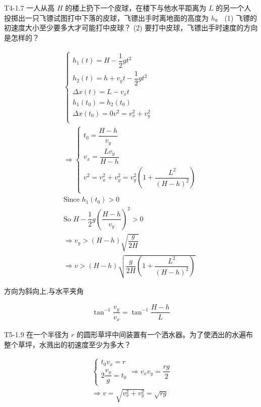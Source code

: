 \documentclass[UTF8]{ctexart} %
\begin{document}
\begin{question}{T4-1.7}
一人从高 \(H\) 的楼上扔下一个皮球，在楼下与他水平距离为 \(L\) 的另一个人投掷出一只飞镖试图打中下落的皮球，飞镖出手时离地面的高度为 \(h\)。
(1) 飞镖的初速度大小至少要多大才可能打中皮球？
(2) 要打中皮球，飞镖出手时速度的方向是怎样的？
\end{question}
\begin{solve}
\[
\begin{gathered}
\begin{cases}
h_1(t)=H-\dfrac{1}{2} gt^2 \\
h_2(t)=h+v_yt-\dfrac{1}{2} gt^2 \\
\Delta x(t)=L-v_xt \\
h_1(t_0)=h_2(t_0) \\
\Delta x(t_0)=0
v^2=v_x^2+v_y^2 \\
\end{cases} \\
\Rightarrow \begin{cases}
t_0=\dfrac{H-h}{v_y} \\
v_x=\dfrac{Lv_y}{H-h}  \\
v^2=v_x^2+v_y^2=v_y^2(1+\dfrac{L^2}{(H-h)^2} )  \\
\end{cases} \\
\text{Since }h_1(t_0)>0  \\
\text{So } H-\dfrac{1}{2} g(\dfrac{H-h}{v_y} )^2>0 \\
\Rightarrow v_y>(H-h)\sqrt{ \dfrac{g}{2H}  }  \\
\Rightarrow v> (H-h)\sqrt {\dfrac{g}{2H}(1+\dfrac{L^2}{(H-h)^2} ) } 
\end{gathered}
\]

方向为斜向上,与水平夹角

\[
\begin{gathered}
\tan^{-1} \dfrac{v_y}{v_x} =\tan^{-1} \dfrac{H-h}{L} 
\end{gathered}
\]

\end{solve}

\begin{question}{T5-1.9}
在一个半径为 \(r\) 的圆形草坪中间装置有一个洒水器。为了使洒出的水遍布整个草坪，水溅出的初速度至少为多大？
\end{question}
\begin{solve}
\[
\begin{gathered}
\begin{cases}
t_0v_x=r \\
2\dfrac{v_y}g=t_0
\end{cases}
\Rightarrow 
v_xv_y=\dfrac{rg}{2}  \\
\Rightarrow v=\sqrt{ v_x^2+v_y^2 } =\sqrt{rg}
\end{gathered}
\]

\end{solve}
\end{document}
